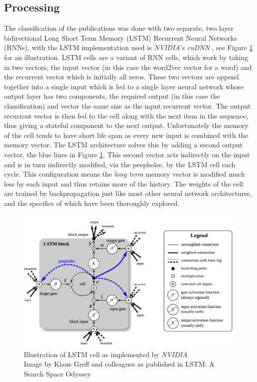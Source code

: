 \documentclass[12pt, a4paper]{article}
\begin{document}
 \subsection{Processing}

The classification of the publications was done with two separate, two layer bidirectional \citep{graves2013hybrid} Long Short Term Memory (LSTM) \citep{Hochreiter:1997:LSM:1246443.1246450} Recurrent Neural Networks (RNNs), with the LSTM implementation used is \textit{NVIDIA}'s \textit{cuDNN} \citep{chetlur2014cudnn}, see Figure \ref{lstm} for an illustration. LSTM cells are a variant of RNN cells, which work by taking in two vectors, the input vector (in this case the word2vec vector for a word) and the recurrent vector which is initially all zeros. These two vectors are append together into a single input which is fed to a single layer neural network whose output layer has two components, the required output (in this case the classification) and vector the same size as the input recurrent vector. The output recurrent vector is then fed to the cell along with the next item in the sequence, thus giving a stateful component to the next output. Unfortunately the memory of the cell tends to have short life span \citep{greff2017lstm} as every new input is combined with the memory vector. The LSTM architecture solves this by adding a second output vector, the blue lines in Figure \ref{lstm}. This second vector acts indirectly on the input and is in turn indirectly modified, via the peepholes, by the LSTM cell each cycle. This configuration means the \textit{long term} memory vector is modified much less by each input and thus retains more of the history. The weights of the cell are trained by backpropagation\citep{pytorch} just like most other neural network architectures, and the specifics of which have been thoroughly explored\citep{riedmiller1993direct}.

\begin{figure}[ht]
	\centering
	\begin{adjustbox}{center}
		\includegraphics[width=1\textwidth]{LSTM.png}
	\end{adjustbox}
	\caption{Illustration of LSTM cell as implemented by \textit{NVIDIA}\\Image by Klaus Greff and colleagues as published in LSTM: A Search Space Odyssey \citep{greff2017lstm}}\label{lstm}
\end{figure}
\end{document}
